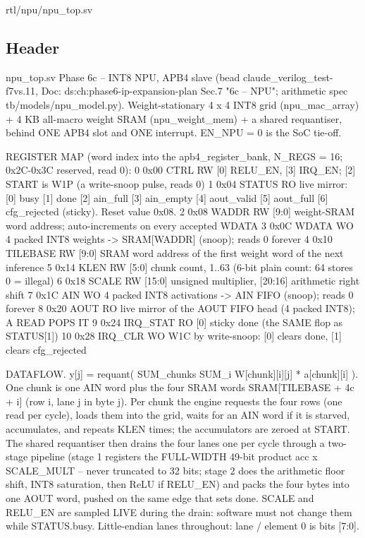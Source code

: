 \begin{relocated}{rtl/npu/npu_top.sv}

\subsection*{Header}

\begin{textblock}
npu_top.sv
Phase 6c -- INT8 NPU, APB4 slave (bead claude_verilog_test-f7vs.11,
Doc: ds:ch:phase6-ip-expansion-plan Sec.7 "6c -- NPU"; arithmetic spec tb/models/npu_model.py).
Weight-stationary 4 x 4 INT8 grid (npu_mac_array) + 4 KB all-macro weight SRAM (npu_weight_mem)
+ a shared requantiser, behind ONE APB4 slot and ONE interrupt. EN_NPU = 0 is the SoC tie-off.

REGISTER MAP (word index into the apb4_register_bank, N_REGS = 16; 0x2C-0x3C reserved, read 0):
  0  0x00 CTRL      RW  [0] RELU_EN, [3] IRQ_EN; [2] START is W1P (a write-snoop pulse, reads 0)
  1  0x04 STATUS    RO  live mirror: [0] busy [1] done [2] ain_full [3] ain_empty [4] aout_valid
                        [5] aout_full [6] cfg_rejected (sticky). Reset value 0x08.
  2  0x08 WADDR     RW  [9:0] weight-SRAM word address; auto-increments on every accepted WDATA
  3  0x0C WDATA     WO  4 packed INT8 weights -> SRAM[WADDR] (snoop); reads 0 forever
  4  0x10 TILEBASE  RW  [9:0] SRAM word address of the first weight word of the next inference
  5  0x14 KLEN      RW  [5:0] chunk count, 1..63 (6-bit plain count: 64 stores 0 = illegal)
  6  0x18 SCALE     RW  [15:0] unsigned multiplier, [20:16] arithmetic right shift
  7  0x1C AIN       WO  4 packed INT8 activations -> AIN FIFO (snoop); reads 0 forever
  8  0x20 AOUT      RO  live mirror of the AOUT FIFO head (4 packed INT8); A READ POPS IT
  9  0x24 IRQ_STAT  RO  [0] sticky done (the SAME flop as STATUS[1])
  10 0x28 IRQ_CLR   WO  W1C by write-snoop: [0] clears done, [1] clears cfg_rejected

DATAFLOW. y[j] = requant( SUM_chunks SUM_i W[chunk][i][j] * a[chunk][i] ). One chunk is one AIN
word plus the four SRAM words SRAM[TILEBASE + 4c + i] (row i, lane j in byte j). Per chunk the
engine requests the four rows (one read per cycle), loads them into the grid, waits for an AIN
word if it is starved, accumulates, and repeats KLEN times; the accumulators are zeroed at START.
The shared requantiser then drains the four lanes one per cycle through a two-stage pipeline
(stage 1 registers the FULL-WIDTH 49-bit product acc x SCALE_MULT -- never truncated to 32 bits;
stage 2 does the arithmetic floor shift, INT8 saturation, then ReLU if RELU_EN) and packs the
four bytes into one AOUT word, pushed on the same edge that sets done. SCALE and RELU_EN are
sampled LIVE during the drain: software must not change them while STATUS.busy.
Little-endian lanes throughout: lane / element 0 is bits [7:0].


\end{textblock}
\end{relocated}
